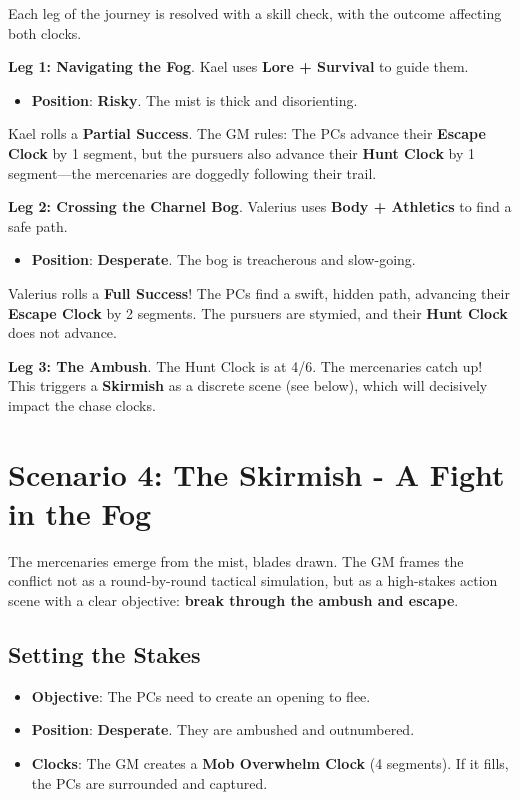 Each leg of the journey is resolved with a skill check, with the outcome affecting both clocks.

\textbf{Leg 1: Navigating the Fog}. Kael uses \textbf{Lore + Survival} to guide them.

\begin{itemize}
    \item \textbf{Position}: \textbf{Risky}. The mist is thick and disorienting.
\end{itemize}

Kael rolls a \textbf{Partial Success}. The GM rules: The PCs advance their \textbf{Escape Clock} by 1 segment, but the pursuers also advance their \textbf{Hunt Clock} by 1 segment—the mercenaries are doggedly following their trail.

\textbf{Leg 2: Crossing the Charnel Bog}. Valerius uses \textbf{Body + Athletics} to find a safe path.

\begin{itemize}
    \item \textbf{Position}: \textbf{Desperate}. The bog is treacherous and slow-going.
\end{itemize}

Valerius rolls a \textbf{Full Success}! The PCs find a swift, hidden path, advancing their \textbf{Escape Clock} by 2 segments. The pursuers are stymied, and their \textbf{Hunt Clock} does not advance.

\textbf{Leg 3: The Ambush}. The Hunt Clock is at 4/6. The mercenaries catch up! This triggers a \textbf{Skirmish} as a discrete scene (see below), which will decisively impact the chase clocks.

\section*{Scenario 4: The Skirmish - A Fight in the Fog}

The mercenaries emerge from the mist, blades drawn. The GM frames the conflict not as a round-by-round tactical simulation, but as a high-stakes action scene with a clear objective: \textbf{break through the ambush and escape}.

\subsection*{Setting the Stakes}

\begin{itemize}
    \item \textbf{Objective}: The PCs need to create an opening to flee.
    \item \textbf{Position}: \textbf{Desperate}. They are ambushed and outnumbered.
    \item \textbf{Clocks}: The GM creates a \textbf{Mob Overwhelm Clock} (4 segments). If it fills, the PCs are surrounded and captured.
\end{itemize}

